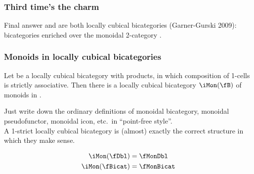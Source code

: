 \documentclass{beamer}
\begin{document}
\begin{frame}
  \frametitle{Third time's the charm}
  \begin{block}{Final answer}
    \fBicat and \fMonBicat are both \alert{locally cubical bicategories} (Garner-Gurski 2009): bicategories enriched over the monoidal 2-category \cDbl.
  \end{block}
\end{frame}

\begin{frame}
  \frametitle{Monoids in locally cubical bicategories}
  \begin{theorem}[Hansen--S.]
    Let \fB be a locally cubical bicategory with products, in which composition of 1-cells is strictly associative.
    Then there is a locally cubical bicategory $\iMon(\fB)$ of monoids in \fB.
  \end{theorem}
  Just write down the ordinary definitions of monoidal bicategory, monoidal pseudofunctor, monoidal icon, etc.\ in ``point-free style''.\\
  A 1-strict locally cubical bicategory is (almost) exactly the correct structure in which they make sense.
  \begin{example}\vspace{-.7cm}
  \begin{align*}
    \iMon(\fDbl) &= \fMonDbl\\
    \iMon(\fBicat) &= \fMonBicat
  \end{align*}
\end{example}
\end{frame}
\end{document}
